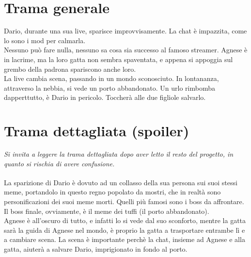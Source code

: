 \section{Trama generale}
    Dario, durante una sua live, sparisce improvvisamente. La chat è impazzita, come lo sono i mod per calmarla.\\
    Nessuno può fare nulla, nessuno sa cosa sia successo al famoso streamer. Agnese è in lacrime, ma la loro gatta
    non sembra spaventata, e appena si appoggia sul grembo della padrona spariscono anche loro.\\
    La live cambia scena, passando in un mondo sconosciuto. In lontananza, attraverso la nebbia, si vede un porto abbandonato.
    Un urlo rimbomba dapperttutto, è Dario in pericolo. Toccherà alle due figliole salvarlo.
    
\newpage
\section{Trama dettagliata (spoiler)}
    \emph{Si invita a leggere la trama dettagliata dopo aver letto il resto del progetto, in quanto si rischia di avere confusione.}\\\\
    La sparizione di Dario è dovuto ad un collasso della sua persona sui suoi stessi meme, portandolo in questo regno popolato
    da mostri, che in realtà sono personificazioni dei suoi meme morti. Quelli più famosi sono i boss da affrontare. Il boss finale,
    ovviamente, è il meme dei tuffi (il porto abbandonato).\\
    Agnese è all'oscuro di tutto, e infatti lo si vede dal suo sconforto, mentre la gatta sarà
    la guida di Agnese nel mondo, è proprio la gatta a trasportare entrambe lì e a cambiare scena. La scena è importante perchè
    la chat, insieme ad Agnese e alla gatta, aiuterà a salvare Dario, imprigionato in fondo al porto.\\
    
